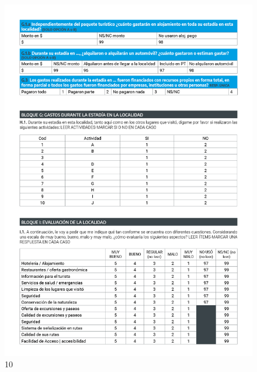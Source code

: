 \documentclass[
]{book}
\begin{document}
\begin{figure}

{\centering \includegraphics[width=1\linewidth]{imagenes/graf010} 

}

\caption{10}\label{fig:010}
\end{figure}
\end{document}
